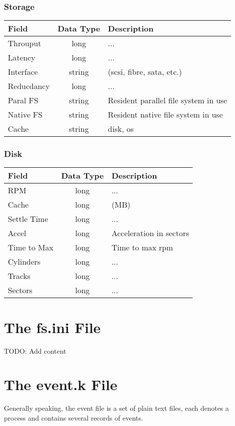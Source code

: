 \documentclass[9pt]{article}
\begin{document}
\subsubsection{Storage}
\label{sec:Storage}
\begin{center}
	\begin{tabular}{l | c | l}
		Field & Data Type & Description\\\hline
		Throuput & long & ... \\
		Latency & long & ... \\
		Interface & string & (scsi, fibre, sata, etc.)\\
		Reducdancy & long & ...\\
		Paral FS & string & Resident parallel file system in use\\
		Native FS & string & Resident native file system in use \\
		Cache & string & disk, os \\
	\end{tabular}
\end{center}

\subsubsection{Disk}
\label{sec:Disk}
\begin{center}
	\begin{tabular}{l | c | l}
		Field & Data Type & Description\\\hline
		RPM & long & ...\\
		Cache & long & (MB)\\
		Settle Time & long & ...\\
		Accel & long & Acceleration in sectors\\
		Time to Max & long & Time to max rpm \\
		Cylinders & long & ...\\
		Tracks & long & ...\\
		Sectors & long & ...\\
	\end{tabular}
\end{center}

\section{The fs.ini File}
\label{sec:TheFsIniFile}
TODO: Add content

\section{The event.k File}
\label{sec:TheEventKFile}
Generally speaking, the event file is a set of plain text files, each denotes a process and contains several records of events.
\end{document}
